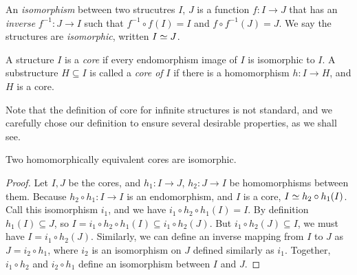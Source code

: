 \documentclass[acmsmall,screen,nonacm,review]{acmart}
\begin{document}
\begin{definition}
    An {\em isomorphism} between two strucutres $I$, $J$ 
    is a function $f: I \rightarrow J$ that 
    has an {\em inverse} $f^{-1}: J \rightarrow I$
    such that $f^{-1} \circ f (I)= I$ and $f \circ f^{-1} (J) = J$.
    We say the structures are {\em isomorphic}, written $I \simeq J$.
\end{definition}

\begin{definition}
    A structure $I$ is a {\em core} if every endomorphism image 
    of $I$ is isomorphic to $I$.
    A substructure $H \subseteq I$ is called a {\em core of} $I$
    if there is a homomorphism $h: I \rightarrow H$, and $H$ is a core.
\end{definition}

Note that the definition of core for infinite structures is not standard, 
 and we carefully chose our definition to ensure several desirable properties, 
 as we shall see.

\begin{lemma}\label{lem:core-iso}
    Two homomorphically equivalent cores are isomorphic.
\end{lemma}
\begin{proof}
    Let $I, J$ be the cores,
    and $h_1: I \rightarrow J$, $h_2: J \rightarrow I$ be 
    homomorphisms between them.
    Because $h_2 \circ h_1 : I \rightarrow I$ is an endomorphism, 
    and $I$ is a core, $I \simeq h_2 \circ h_1(I)$.
    Call this isomorphism $i_1$, and we have $i_1 \circ h_2 \circ h_1(I) = I$.
    By definition $h_1(I) \subseteq J$, 
    so $I = i_1 \circ h_2 \circ h_1(I) \subseteq i_1 \circ h_2(J)$.
    But $i_1 \circ h_2(J) \subseteq I$,
    we must have $I = i_1 \circ h_2(J)$.
    Similarly, we can define an inverse mapping from $I$ to $J$
    as $J = i_2 \circ h_1$, where $i_2$ is an isomorphism on 
    $J$ defined similarly as $i_1$.
    Together, $i_1 \circ h_2$ and $i_2 \circ h_1$ define an isomorphism 
    between $I$ and $J$.
\end{proof}
\end{document}
